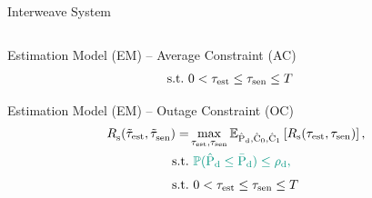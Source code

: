 \documentclass[16pt]{beamer}
\begin{document}
\begin{frame}[t]{Interweave System}
\begin{columns}
\begin{column}{0.62\columnwidth}
\begin{center}
\begin{overlayarea}{\textwidth}{2.6cm}
{\begin{block}{\scriptsize Estimation Model (EM) -- Average Constraint (AC)}
\begin{align*}
\text{s.t.} & \text{ }  0 < \tau_{\text{est}} \le \tau_{\text{sen}} \le T
					\end{align*} 
               		 	\end{block}
			} 
			{	
				\begin{block}{\scriptsize Estimation Model (EM) -- Outage Constraint (OC)} 
                               	 \vspace{-3.2mm}
					\begin{align*}
					\trsac(\ttest, \ttsenac) =& \maxi_{\test, \tsen} \e{\epd, \ecz, \eco}{\rs(\test, \tsen)},	\\	
					\text{s.t.} & \text{ }  \color{kit-green100}{\p(\epd \le \pdd) \le \mpd}, \\[0.35em]
\text{s.t.} & \text{ }  0 < \test \le \tsen \le T
					\end{align*} 
               		 	\end{block}
			} 
                        \end{overlayarea}
		\end{center}
		\end{column}
	\end{columns}
\end{frame}
\end{document}
